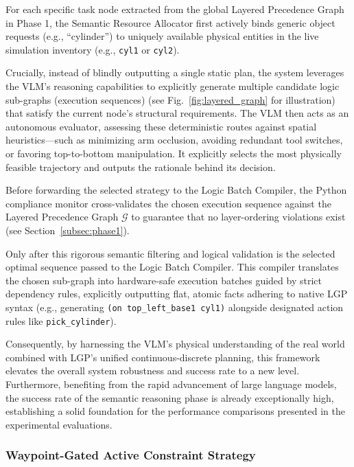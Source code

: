 \documentclass[journal]{IEEEtran}
\begin{document}
  For each specific task node extracted from the global Layered Precedence Graph
  in Phase 1, the Semantic Resource Allocator first actively binds generic object
  requests (e.g., ``cylinder'') to uniquely available physical entities in the live
  simulation inventory (e.g., \texttt{cyl1} or \texttt{cyl2}).

  Crucially, instead of blindly outputting a single static plan, the system leverages
  the VLM's reasoning capabilities to explicitly generate multiple candidate logic
  sub-graphs (execution sequences) (see Fig.~\ref{fig:layered_graph} for illustration)
  that satisfy the current node's structural requirements. The VLM then acts as an
  autonomous evaluator, assessing these deterministic routes against spatial
  heuristics---such as minimizing arm occlusion, avoiding redundant tool switches,
  or favoring top-to-bottom manipulation. It explicitly selects the most physically
  feasible trajectory and outputs the rationale behind its decision.

  Before forwarding the selected strategy to the Logic Batch Compiler, the Python
  compliance monitor cross-validates the chosen execution sequence against the
  Layered Precedence Graph $\mathcal{G}$ to guarantee that no layer-ordering
  violations exist (see Section~\ref{subsec:phase1}).

  Only after this rigorous semantic filtering and logical validation is the selected
  optimal sequence passed to the Logic Batch Compiler. This compiler translates
  the chosen sub-graph into hardware-safe execution batches guided by strict
  dependency rules, explicitly outputting flat, atomic facts adhering to native
  LGP syntax (e.g., generating \texttt{(on top\_left\_base1 cyl1)} alongside
  designated action rules like \texttt{pick\_cylinder}).

  Consequently, by harnessing the VLM's physical understanding of the real world
  combined with LGP's unified continuous-discrete planning, this framework
  elevates the overall system robustness and success rate to a new level. Furthermore,
  benefiting from the rapid advancement of large language models, the success rate
  of the semantic reasoning phase is already exceptionally high, establishing a
  solid foundation for the performance comparisons presented in the experimental
  evaluations.

  \subsubsection{Waypoint-Gated Active Constraint Strategy}
  \label{subsubsec:active_constraints}
\end{document}
